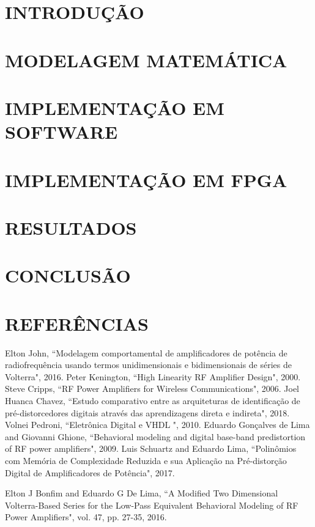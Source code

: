 \documentclass[twocolumn, a4paper]{article}
\begin{document}
\section{INTRODUÇÃO}


\section{MODELAGEM MATEMÁTICA}


\section{IMPLEMENTAÇÃO EM SOFTWARE} \label{sec:implsoft}


\section{IMPLEMENTAÇÃO EM FPGA}


\section{RESULTADOS}


\section{CONCLUSÃO}


\section*{REFERÊNCIAS}
\begingroup
\renewcommand{\section}[2]{}%

\begin{thebibliography}{}
	 Elton John, ``Modelagem comportamental de amplificadores de potência de radiofrequência usando termos unidimensionais e bidimensionais de séries de Volterra", 2016.
	 Peter Kenington, ``High Linearity RF Amplifier Design", 2000.
	 Steve Cripps, ``RF Power Amplifiers for Wireless Communications", 2006.
	 Joel Huanca Chavez, ``Estudo comparativo entre as arquiteturas de identificação de pré-distorcedores digitais através das aprendizagens direta e indireta", 2018.
	 Volnei Pedroni, ``Eletrônica Digital e VHDL ", 2010.
	 Eduardo Gonçalves de Lima and Giovanni Ghione, ``Behavioral modeling and digital base-band predistortion of RF power amplifiers", 2009.
	 Luis Schuartz and Eduardo Lima, ``Polinômios com Memória de Complexidade Reduzida e sua Aplicação na Pré-distorção Digital de Amplificadores de Potência", 2017.
	
	 Elton J Bonfim and Eduardo G De Lima, ``A Modified Two Dimensional Volterra-Based Series for the Low-Pass Equivalent Behavioral Modeling of RF Power Amplifiers", vol. 47, pp. 27-35, 2016.
	
\end{thebibliography}
\endgroup
\end{document}
